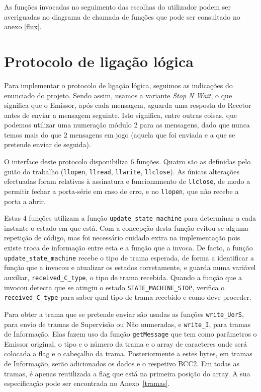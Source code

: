 \documentclass[11pt,a4paper,reqno]{report}
\numberwithin{equation}{section}
\begin{document}
As funções invocadas no seguimento das escolhas do utilizador podem ser averiguadas no diagrama de chamada de funções que pode ser consultado no anexo \ref{flux}.

\chapter{Protocolo de ligação lógica}

Para implementar o protocolo de ligação lógica, seguimos as indicações do enunciado do projeto. Sendo assim, usamos a variante \emph{Stop N Wait}, o que significa que o Emissor, após cada mensagem, aguarda uma resposta do Recetor antes de enviar a mensagem seguinte. Isto significa, entre outras coisas, que podemos utilizar uma numeração módulo 2 para as mensagens, dado que nunca temos mais do que 2 mensagens em jogo (aquela que foi enviada e a que se pretende enviar de seguida).

O interface deste protocolo disponibiliza 6 funções. Quatro são as definidas pelo guião do trabalho (\verb|llopen|, \verb|llread|, \verb|llwrite|, \verb|llclose|). As únicas alterações efectuadas foram relativas à assinatura e funcionamento de \verb|llclose|, de modo a permitir fechar a porta-série em caso de erro, e no \verb|llopen|, que não recebe a porta a abrir. 

Estas 4 funções utilizam a função \verb|update_state_machine| para determinar a cada instante o estado em que está.
Com a concepção desta função evitou-se alguma repetição de código, mas foi necessário cuidado extra na implementação pois existe troca de informação entre esta e a função que a invoca. De facto, a função \verb|update_state_machine| recebe o tipo de trama esperada, de forma a identificar a função que a invocou e atualizar os estados corretamente, e guarda numa variável auxiliar, \verb|received_C_type|, o tipo de trama recebida. Quando a função que a invocou detecta que se atingiu o estado \verb|STATE_MACHINE_STOP|, verifica o \verb|received_C_type| para saber qual tipo de trama recebido e como deve proceder.

Para obter a trama que se pretende enviar são usadas as funções \verb|write_UorS|, para envio de tramas de Supervisão ou Não numeradas, e \verb|write_I|, para tramas de Informação. Elas fazem uso da função \verb|getMessage| que tem como parâmetros o Emissor original, o tipo e o número da trama e o array de caracteres onde será colocada a flag e o cabeçalho da trama. Posteriormente a estes bytes, em tramas de Informação, serão adicionados os dados e o respetivo BCC2. Em todas as tramas, é apenas reutilizada a flag que está na primeira posição do array. A sua especificação pode ser encontrada no Anexo~\ref{tramas}.
\end{document}
